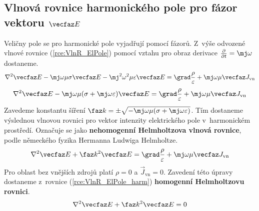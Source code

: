 \subsection*{Vlnová rovnice harmonického pole pro fázor vektoru $\vecfaz E$}
Veličny pole se pro harmonické pole vyjadřují pomocí fázorů. Z~výše odvozené vlnové rovnice (\ref{rce:VlnR_ElPole}) pomocí vztahu pro obraz derivace $\frac{\partial}{\partial t}=\mj\omega$ dostaneme.
\begin{displaymath}
	\nabla^{2}\vecfaz E -\mj\omega\mu\sigma\vecfaz E-\mj^{2}\omega ^{2}\mu\varepsilon\vecfaz E = \grad\frac{\rho}{\varepsilon}+\mj\omega\mu\vecfaz J_{\mathrm{vn}}
\end{displaymath}
\begin{displaymath}
	\nabla^{2}\vecfaz E -\mj\omega\mu(\sigma+\mj\omega\varepsilon)\vecfaz E = \grad\frac{\rho}{\varepsilon}+ \mj\omega\mu\vecfaz J_{\mathrm{vn}}
\end{displaymath}
Zavedeme konstantu šíření $\faz k=\pm\sqrt{-\mj\omega\mu(\sigma+\mj\omega\varepsilon)}$. Tím dostaneme výslednou vlnovou rovnici pro vektor intenzity elektrického pole v~harmonickém prostředí. Označuje se jako {\bf nehomogenní Helmholtzova vlnová rovnice}, podle německého fyzika Hermanna Ludwiga Helmholtze.
\begin{equation}
	\nabla^{2}\vecfaz E +\faz k^{2}\vecfaz E = \grad\frac{\rho}{\varepsilon}+ \mj\omega\mu\vecfaz J_{\mathrm{vn}}
	\label{rce:VlnR_ElPole_harm} 
\end{equation}
Pro oblast bez vnějších zdrojů platí $\rho = 0$ a $\vec J_{\mathrm{vn}} = 0$. Zavedení této úpravy dostaneme z~rovnice (\ref{rce:VlnR_ElPole_harm}) {\bf homogenní Helmholtzovu rovnici}.
\begin{equation}
	\nabla^{2}\vecfaz E +\faz k^{2}\vecfaz E = 0
	\label{rce:VlnR_ElPole_harm_BezZdroju} 
\end{equation}


